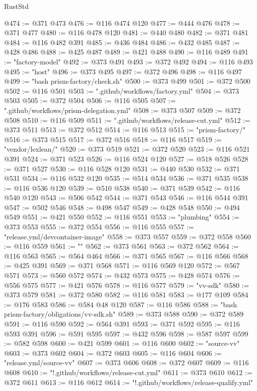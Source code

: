 \begin{lexlean}{RustStd}
\begin{coremodule}
@474 := @371 @473
@476 := @116 @474 @120
@477 := @444 @476
@478 := @371 @477
@480 := @116 @478 @120
@481 := @440 @480
@482 := @371 @481
@484 := @116 @482 @391
@485 := @436 @484
@486 := @432 @485
@487 := @428 @486
@488 := @425 @487
@489 := @421 @488
@490 := @116 @489
@491 := "factory-model"
@492 := @373 @491
@493 := @372 @492
@494 := @116 @493
@495 := "host"
@496 := @373 @495
@497 := @372 @496
@498 := @116 @497
@499 := "bash prism-factory/check.sh"
@500 := @373 @499
@501 := @372 @500
@502 := @116 @501
@503 := ".github/workflows/factory.yml"
@504 := @373 @503
@505 := @372 @504
@506 := @116 @505
@507 := ".github/workflows/prism-delegation.yml"
@508 := @373 @507
@509 := @372 @508
@510 := @116 @509
@511 := ".github/workflows/release-cut.yml"
@512 := @373 @511
@513 := @372 @512
@514 := @116 @513
@515 := "prism-factory/"
@516 := @373 @515
@517 := @372 @516
@518 := @116 @517
@519 := "vendor/lexlean/"
@520 := @373 @519
@521 := @372 @520
@523 := @116 @521 @391
@524 := @371 @523
@526 := @116 @524 @120
@527 := @518 @526
@528 := @371 @527
@530 := @116 @528 @120
@531 := @440 @530
@532 := @371 @531
@534 := @116 @532 @120
@535 := @514 @534
@536 := @371 @535
@538 := @116 @536 @120
@539 := @510 @538
@540 := @371 @539
@542 := @116 @540 @120
@543 := @506 @542
@544 := @371 @543
@546 := @116 @544 @391
@547 := @502 @546
@548 := @498 @547
@549 := @428 @548
@550 := @494 @549
@551 := @421 @550
@552 := @116 @551
@553 := "plumbing"
@554 := @373 @553
@555 := @372 @554
@556 := @116 @555
@557 := "release.yml/devcontainer-image"
@558 := @373 @557
@559 := @372 @558
@560 := @116 @559
@561 := ""
@562 := @373 @561
@563 := @372 @562
@564 := @116 @563
@565 := @564 @464
@566 := @371 @565
@567 := @116 @566
@568 := @425 @391
@569 := @371 @568
@571 := @116 @569 @120
@572 := @567 @571
@573 := @560 @572
@574 := @432 @573
@575 := @428 @574
@576 := @556 @575
@577 := @421 @576
@578 := @116 @577
@579 := "vv-sdk"
@580 := @373 @579
@581 := @372 @580
@582 := @116 @581
@583 := @177 @109
@584 := @176 @583
@586 := @584 @48 @120
@587 := @116 @586
@588 := "bash prism-factory/obligations/vv-sdk.sh"
@589 := @373 @588
@590 := @372 @589
@591 := @116 @590
@592 := @564 @391
@593 := @371 @592
@595 := @116 @593 @391
@596 := @591 @595
@597 := @432 @596
@598 := @587 @597
@599 := @582 @598
@600 := @421 @599
@601 := @116 @600
@602 := "source-vv"
@603 := @373 @602
@604 := @372 @603
@605 := @116 @604
@606 := "release.yml/source-vv"
@607 := @373 @606
@608 := @372 @607
@609 := @116 @608
@610 := "!.github/workflows/release-cut.yml"
@611 := @373 @610
@612 := @372 @611
@613 := @116 @612
@614 := "!.github/workflows/release-qualify.yml"

\end{coremodule}
\end{lexlean}
